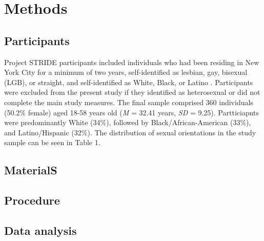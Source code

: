 \documentclass[
  english,
  man,floatsintext]{apa6}
\begin{document}
\hypertarget{methods}{%
\section{Methods}\label{methods}}

\hypertarget{participants}{%
\subsection{Participants}\label{participants}}

Project STRIDE participants included individuals who had been residing in New York City for a minimum of two years, self-identified as lesbian, gay, bisexual (LGB), or straight, and self-identified as White, Black, or Latino \autocite{projectstride}. Participants were excluded from the present study if they identified as heterosexual or did not complete the main study measures. The final sample comprised 360 individuals (50.2\% female) aged 18-58 years old (\emph{M} = 32.41 years, \emph{SD} = 9.25). Partticiapnts were predominantly White (34\%), followed by Black/African-American (33\%), and Latino/Hispanic (32\%). The distribution of sexual orientations in the study sample can be seen in Table 1.

\hypertarget{materials}{%
\subsection{MaterialS}\label{materials}}

\hypertarget{procedure}{%
\subsection{Procedure}\label{procedure}}

\hypertarget{data-analysis}{%
\subsection{Data analysis}\label{data-analysis}}
\end{document}
